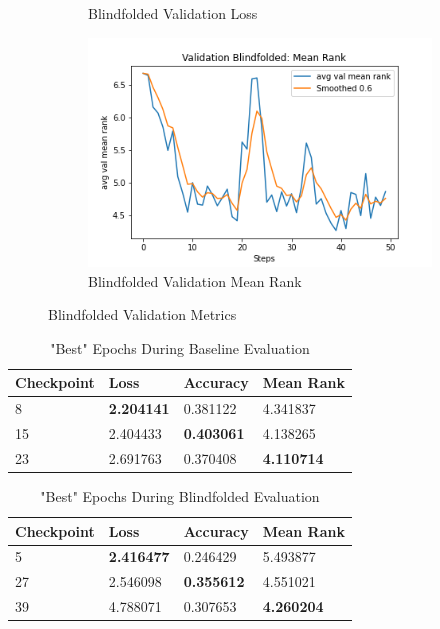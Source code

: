 \begin{figure}[ht!]
\begin{subfigure}[b]{0.3\textwidth}
         \caption{Blindfolded Validation Loss}
         \label{fig:blindfolded_loss}
     \end{subfigure}
     \hfill
     \begin{subfigure}[b]{0.3\textwidth}
         \centering
         \includegraphics[width=\textwidth]{./figure/results/baseline_and_blindfolding/blindfolded/avg val mean rank.png}
         \caption{Blindfolded Validation Mean Rank}
         \label{fig:blindfolded_mean_rank}
     \end{subfigure}
     \caption{Blindfolded Validation Metrics}
     \label{fig:blindfolded_metrics}
\end{figure}

\begin{table}[ht!]
\centering
\caption{"Best" Epochs During Baseline Evaluation}
\begin{tabular}{l | l | l | l}
Checkpoint & Loss & Accuracy & Mean Rank \\
\hline
8 & \textbf{2.204141} & 0.381122 & 4.341837 \\
15 & 2.404433 & \textbf{0.403061} & 4.138265 \\
23 & 2.691763 & 0.370408 & \textbf{4.110714}
\end{tabular}
\label{tab:best_baseline}
\end{table}

\begin{table}[ht!]
\centering
\caption{"Best" Epochs During Blindfolded Evaluation}
\begin{tabular}{l | l | l | l}
Checkpoint & Loss & Accuracy & Mean Rank \\
\hline
5 & \textbf{2.416477} & 0.246429 & 5.493877 \\
27 & 2.546098 & \textbf{0.355612} & 4.551021 \\
39 & 4.788071 & 0.307653 & \textbf{4.260204}
\end{tabular}
\label{tab:best_blindfolded}
\end{table}


